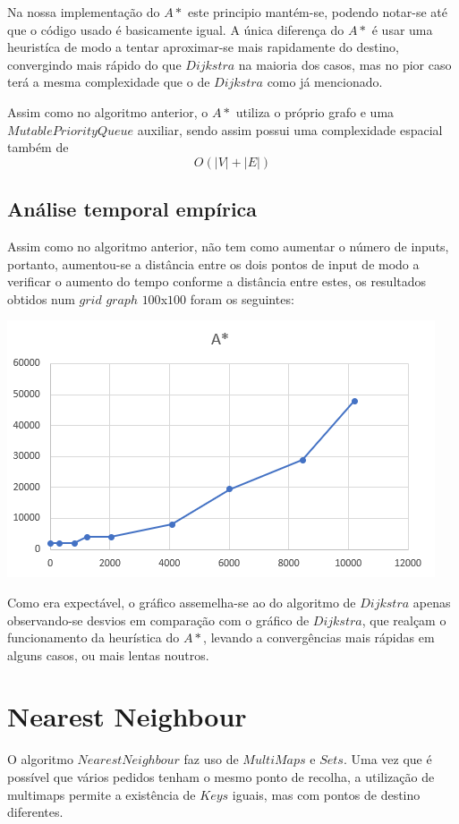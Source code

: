 \documentclass[article, a4paper, 12pt, oneside]{memoir}
\begin{document}
Na nossa implementação do $A*$ este principio mantém-se, podendo notar-se até que o código usado é basicamente igual. A única diferença do $A*$ é usar uma heuristíca de modo a tentar aproximar-se mais rapidamente do destino, convergindo mais rápido do que $Dijkstra$ na maioria dos casos, mas no pior caso terá a mesma complexidade que o de $Dijkstra$ como já mencionado.

Assim como no algoritmo anterior, o $A*$ utiliza o próprio grafo e uma $MutablePriorityQueue$ auxiliar, sendo assim possui uma complexidade espacial também de
\begin{equation}
O(|V|+|E|)
\end{equation}

\subsection{Análise temporal empírica}
Assim como no algoritmo anterior, não tem como aumentar o número de inputs, portanto, aumentou-se a distância entre os dois pontos de input de modo a verificar o aumento do tempo conforme a distância entre estes, os resultados obtidos num $grid$ $graph$ $100$x$100$ foram os seguintes:
\begin{center}
\includegraphics[scale=0.5]{astar_empiric.png}
\end{center}

Como era expectável, o gráfico assemelha-se ao do algoritmo de $Dijkstra$ apenas observando-se desvios em comparação com o gráfico de $Dijkstra$, que realçam o funcionamento da heurística do $A*$, levando a convergências mais rápidas em alguns casos, ou mais lentas noutros.

\section{Nearest Neighbour}
O algoritmo $Nearest Neighbour$ faz uso de $MultiMaps$ e $Sets$. Uma vez que é possível que vários pedidos tenham o mesmo ponto de recolha, a utilização de multimaps permite a
existência de $Keys$ iguais, mas com pontos de destino diferentes.
\end{document}
